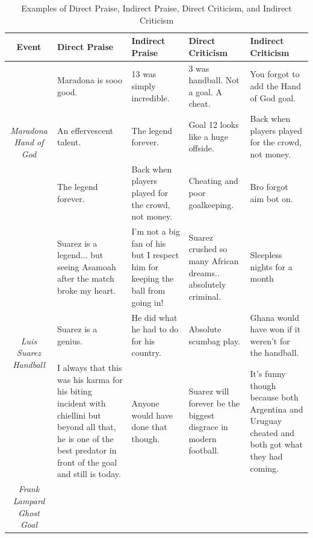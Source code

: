 \documentclass{article}
\begin{document}
\begin{table}[htbp] %
    \centering
    \caption{Examples of Direct Praise, Indirect Praise, Direct Criticism, and Indirect Criticism}
    \label{tab:maradona_suarez_lampard_comments}
    \small %
    \renewcommand{\arraystretch}{1.1} %
    \begin{adjustbox}{max width=\linewidth}
        \begin{tabular}{|c|p{3.5cm}|p{3.5cm}|p{3.5cm}|p{3.5cm}|} %
            \hline
            \textbf{Event} & \textbf{Direct Praise} & \textbf{Indirect Praise} & \textbf{Direct Criticism} & \textbf{Indirect Criticism} \\
            \hline
            \multirow{3}{*}{\textit{Maradona Hand of God}} 
            & Maradona is sooo good. & 13 was simply incredible. & 3 was handball. Not a goal. A cheat. & You forgot to add the Hand of God goal. \\ 
            \cline{2-5}
            & An effervescent talent. & The legend forever. & Goal 12 looks like a huge offside. & Back when players played for the crowd, not money. \\ 
            \cline{2-5}
            & The legend forever. & Back when players played for the crowd, not money. & Cheating and poor goalkeeping. & Bro forgot aim bot on. \\ 
            \hline
            \multirow{3}{*}{\textit{Luis Suarez Handball}} 
            & Suarez is a legend... but seeing Asamoah after the match broke my heart. & I'm not a big fan of his but I respect him for keeping the ball from going in!  & Suarez crushed so many African dreams.. absolutely criminal. &Sleepless nights for a month \\ 
            \cline{2-5}
            & Suarez is a genius. & He did what he had to do for his country. & Absolute scumbag play. & Ghana would have won if it weren't for the handball. \\ 
            \cline{2-5}
            & I always that this was his karma for his biting incident with chiellini but beyond all that, he is one of the best predator in front of the goal and still is today. & Anyone would have done that though. & Suarez will forever be the biggest disgrace in modern football. & It's funny though because both Argentina and Uruguay cheated and both got what they had coming. \\ 
            \hline
            \multirow{3}{*}{\textit{Frank Lampard Ghost Goal}} 

\end{tabular}
\end{adjustbox}
\end{table}
\end{document}
